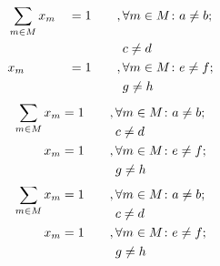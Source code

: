 \documentclass{scrbook}
\begin{document}
\begin{alignat}{3}
        &   \sum_{m \in M}  x_m     && = 1      & \quad &   , \forall m \in M \colon a \neq b ;                     \notag  \\
        &                                                                   &&              &               &   \phantom{,{}}   c \neq d                                                                \\
        &                                                       x_m     && = 1      &               &   , \forall m \in M \colon e \neq f ;                     \notag  \\
        &                                                                   &&              &               &   \phantom{,{}}   g \neq h
\end{alignat}
\begin{alignat}{2}
\smash[b]{\sum_{m \in M}}\, x_m &= 1\quad && , \forall m \in M \colon a \neq b ; \notag \\
                                &         && \phantom{,{}}   c \neq d \\
               x_m              &= 1      && , \forall m \in M \colon e \neq f ; \notag  \\
                                &         && \phantom{,{}}   g \neq h
\end{alignat}
\begin{alignat}{2}
\smash{\sum_{m \in M}}\, x_m &= 1\quad && , \forall m \in M \colon a \neq b ; \notag \\
                                &         && \phantom{,{}}   c \neq d \\
               x_m              &= 1      && , \forall m \in M \colon e \neq f ; \notag  \\
                                &         && \phantom{,{}}   g \neq h
\end{alignat}
\end{document}
